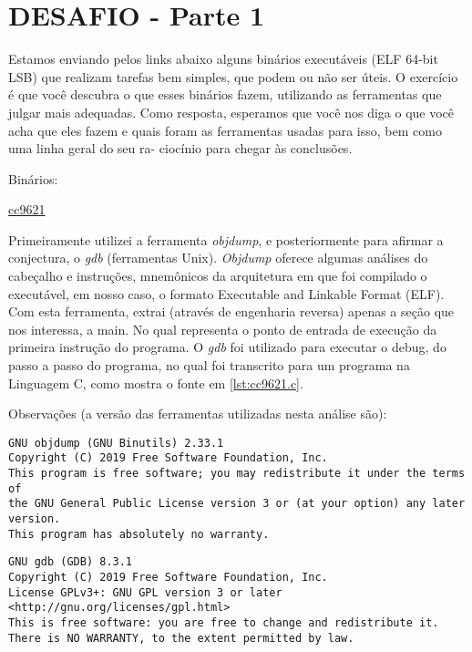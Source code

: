\section{DESAFIO - Parte 1} \label{sec:desafio1}

Estamos enviando pelos links abaixo alguns binários executáveis (ELF
64-bit LSB) que realizam tarefas bem simples, que podem ou não ser
úteis. O exercício é que você descubra o que esses binários fazem,
utilizando as ferramentas que julgar mais adequadas. Como resposta,
esperamos que você nos diga o que você acha que eles fazem e quais
foram as ferramentas usadas para isso, bem como uma linha geral do seu
ra- ciocínio para chegar às conclusões.\\\par


Binários:

\href{https://s3.amazonaws.com/chaordic-desafio-cloud/cc9621}{cc9621}

Primeiramente utilizei a ferramenta \emph{objdump}, e posteriormente
para afirmar a conjectura, o \emph{gdb} (ferramentas Unix).
\emph{Objdump} oferece algumas análises do cabeçalho e instruções,
mnemônicos da arquitetura em que foi compilado o executável, em nosso
caso, o formato Executable and Linkable Format (ELF). Com esta
ferramenta, extrai (através de engenharia reversa) apenas a seção que
nos interessa, a main. No qual representa o ponto de entrada de
execução da primeira instrução do programa. O \emph{gdb} foi utilizado
para executar o debug, do passo a passo do programa, no qual foi
transcrito para um programa na Linguagem C, como mostra o fonte em
\ref{lst:cc9621.c}.

Observações (a versão das ferramentas utilizadas nesta análise são):
\begin{verbatim}
GNU objdump (GNU Binutils) 2.33.1
Copyright (C) 2019 Free Software Foundation, Inc.
This program is free software; you may redistribute it under the terms of
the GNU General Public License version 3 or (at your option) any later version.
This program has absolutely no warranty.
\end{verbatim}

\begin{verbatim}
GNU gdb (GDB) 8.3.1
Copyright (C) 2019 Free Software Foundation, Inc.
License GPLv3+: GNU GPL version 3 or later <http://gnu.org/licenses/gpl.html>
This is free software: you are free to change and redistribute it.
There is NO WARRANTY, to the extent permitted by law.
\end{verbatim}

